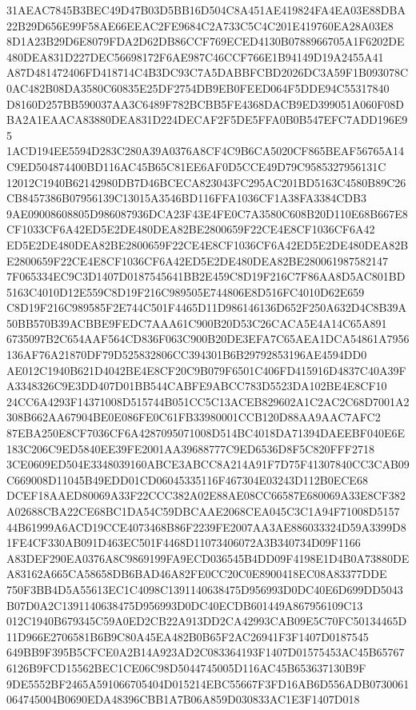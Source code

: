 \documentclass[UTF8,fontset=fandol,zihao=-4,a4paper]{ctexart}
\begin{document}
{{31AEAC7845B3BEC49D47B03D5BB16D504C8A451AE419824FA4EA03E88DBA22B29D656E99F58AE66EEAC2FE9684C2A733C5C4C201E419760EA28A03E8
8D1A23B29D6E8079FDA2D62DB86CCF769ECED4130B0788966705A1F6202DE480DEA831D227DEC56698172F6AE987C46CCF766E1B94149D19A2455A41
A87D481472406FD418714C4B3DC93C7A5DABBFCBD2026DC3A59F1B093078C0AC482B08DA3580C60835E25DF2754DB9EB0FEED064F5DDE94C55317840
D8160D257BB590037AA3C6489F782BCBB5FE4368DACB9ED399051A060F08DBA2A1EAACA83880DEA831D224DECAF2F5DE5FFA0B0B547EFC7ADD196E95
1ACD194EE5594D283C280A39A0376A8CF4C9B6CA5020CF865BEAF56765A14C9ED504874400BD116AC45B65C81EE6AF0D5CCE49D79C9585327956131C
12012C1940B62142980DB7D46BCECA823043FC295AC201BD5163C4580B89C26CB8457386B07956139C13015A3546BD116FFA1036CF1A38FA3384CDB3
9AE09008608805D986087936DCA23F43E4FE0C7A3580C608B20D110E68B667E8CF1033CF6A42ED5E2DE480DEA82BE2800659F22CE4E8CF1036CF6A42
ED5E2DE480DEA82BE2800659F22CE4E8CF1036CF6A42ED5E2DE480DEA82BE2800659F22CE4E8CF1036CF6A42ED5E2DE480DEA82BE280061987582147
7F065334EC9C3D1407D0187545641BB2E459C8D19F216C7F86AA8D5AC801BD5163C4010D12E559C8D19F216C989505E744806E8D516FC4010D62E659
C8D19F216C989585F2E744C501F4465D11D986146136D652F250A632D4C8B39A50BB570B39ACBBE9FEDC7AAA61C900B20D53C26CACA5E4A14C65A891
6735097B2C654AAF564CD836F063C900B20DE3EFA7C65AEA1DCA54861A7956136AF76A21870DF79D525832806CC394301B6B29792853196AE4594DD0
AE012C1940B621D4042BE4E8CF20C9B079F6501C406FD415916D4837C40A39FA3348326C9E3DD407D01BB544CABFE9ABCC783D5523DA102BE4E8CF10
24CC6A4293F14371008D515744B051CC5C13ACEB829602A1C2AC2C68D7001A2308B662AA67904BE0E086FE0C61FB33980001CCB120D88AA9AAC7AFC2
87EBA250E8CF7036CF6A4287095071008D514BC4018DA71394DAEEBF040E6E183C206C9ED5840EE39FE2001AA39688777C9ED6536D8F5C820FFF2718
3CE0609ED504E3348039160ABCE3ABCC8A214A91F7D75F41307840CC3CAB09C669008D11045B49EDD01CD06045335116F467304E03243D112B0ECE68
DCEF18AAED80069A33F22CCC382A02E88AE08CC66587E680069A33E8CF382A02688CBA22CE68BC1DA54C59DBCAAE2068CEA045C3C1A94F71008D5157
44B61999A6ACD19CCE4073468B86F2239FE2007AA3AE886033324D59A3399D81FE4CF330AB091D463EC501F4468D11073406072A3B340734D09F1166
A83DEF290EA0376A8C9869199FA9ECD036545B4DD09F4198E1D4B0A73880DEA83162A665CA58658DB6BAD46A82FE0CC20C0E8900418EC08A83377DDE
750F3BB4D5A55613EC1C4098C1391140638475D956993D0DC40E6D699DD5043B07D0A2C1391140638475D956993D0DC40ECDB601449A867956109C13
012C1940B679345C59A0ED2CB22A913DD2CA42993CAB09E5C70FC50134465D11D966E2706581B6B9C80A45EA482B0B65F2AC26941F3F1407D0187545
649BB9F395B5CFCE0A2B14A923AD2C083364193F1407D01575453AC45B657676126B9FCD15562BEC1CE06C98D5044745005D116AC45B653637130B9F
9DE5552BF2465A591066705404D015214EBC55667F3FD16AB6D556ADB0730061064745004B0690EDA48396CBB1A7B06A859D030833AC1E3F1407D018
}}
\end{document}
